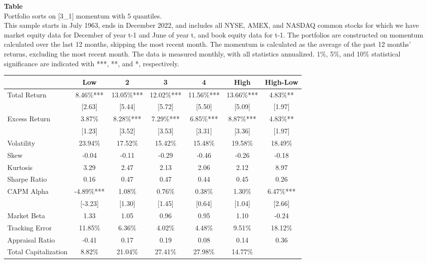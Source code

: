 \begin{table*}[ht!]
\raggedright
{}
\label{tab: quantile_sort_mom_[3_1]_with_5_quantiles}
\textbf{Table \thetable} \\
Portfolio sorts on [3\_1] momentum with 5 quantiles. \\
\hspace*{1em}This sample starts in July 1963, ends in December 2022, and includes all NYSE, AMEX, and NASDAQ common stocks for which we have market equity data for December of year t-1 and June of year t, and book equity data for t-1. The portfolios are constructed on momentum calculated over the last 12 months, skipping the most recent month. The momentum is calculated as the average of the past 12 months' returns, excluding the most recent month. The data is measured monthly, with all statistics annualized.  1\%, 5\%, and 10\% statistical significance are indicated with ***, **, and *, respectively. \\
\vspace{0.5em}
\centering
\begin{adjustbox}{max width=\textwidth}
\begin{tabular}{@{}lcccccc@{}}
\toprule
 & Low & 2 & 3 & 4 & High & High-Low \\
\midrule
Total Return & 8.46\%*** & 13.05\%*** & 12.02\%*** & 11.56\%*** & 13.66\%*** & 4.83\%** \\
 & [2.63] & [5.44] & [5.72] & [5.50] & [5.09] & [1.97] \\
Excess Return & 3.87\% & 8.28\%*** & 7.29\%*** & 6.85\%*** & 8.87\%*** & 4.83\%** \\
 & [1.23] & [3.52] & [3.53] & [3.31] & [3.36] & [1.97] \\
Volatility & 23.94\% & 17.52\% & 15.42\% & 15.48\% & 19.58\% & 18.49\% \\
Skew & -0.04 & -0.11 & -0.29 & -0.46 & -0.26 & -0.18 \\
Kurtosis & 3.29 & 2.47 & 2.13 & 2.06 & 2.12 & 8.97 \\
Sharpe Ratio & 0.16 & 0.47 & 0.47 & 0.44 & 0.45 & 0.26 \\
CAPM Alpha & -4.89\%*** & 1.08\% & 0.76\% & 0.38\% & 1.30\% & 6.47\%*** \\
 & [-3.23] & [1.30] & [1.45] & [0.64] & [1.04] & [2.66] \\
Market Beta & 1.33 & 1.05 & 0.96 & 0.95 & 1.10 & -0.24 \\
Tracking Error & 11.85\% & 6.36\% & 4.02\% & 4.48\% & 9.51\% & 18.12\% \\
Appraisal Ratio & -0.41 & 0.17 & 0.19 & 0.08 & 0.14 & 0.36 \\
Total Capitalization & 8.82\% & 21.04\% & 27.41\% & 27.98\% & 14.77\% &  \\
\bottomrule
\end{tabular}
\end{adjustbox}
\end{table*}